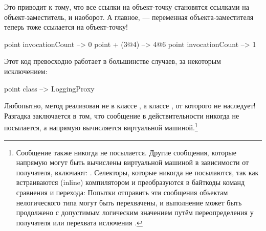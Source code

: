 \documentclass[a4paper,10pt,twoside]{book}
\begin{document}
Это приводит к тому, что все ссылки на объект-точку становятся ссылками на объект-заместитель, и наоборот. А главное, --- переменная  объекта-заместителя теперь тоже ссылается на объект-точку!

\begin{code}{}
point invocationCount --> 0
point + (3@4)             --> 4@6
point invocationCount --> 1
\end{code}

Этот код превосходно работает в большинстве случаев, за некоторым исключением:
\begin{code}{}
point class --> LoggingProxy
\end{code}
Любопытно, метод  реализован не в классе , а классе , от которого  не наследует!
Разгадка заключается в том, что сообщение  в действительности никогда не посылается, а напрямую вычисляется виртуальной машиной.\footnote{Сообщение  также никогда не посылается.
Другие сообщения, которые напрямую могут быть вычислены виртуальной машиной в зависимости от получателя, включают:
\ct{+- < > <= >= = ~= * / \ ==}
.
Селекторы, которые никогда не посылаются, так как встраиваются (inline) компилятором и преобразуются в байткоды команд сравнения и перехода:
Попытки отправить эти сообщения объектам нелогического типа могут быть перехвачены, и выполнение может быть продолжено с допустимым логическим значением путём переопределения  у получателя или перехвата ислючения .
}%
\end{document}
